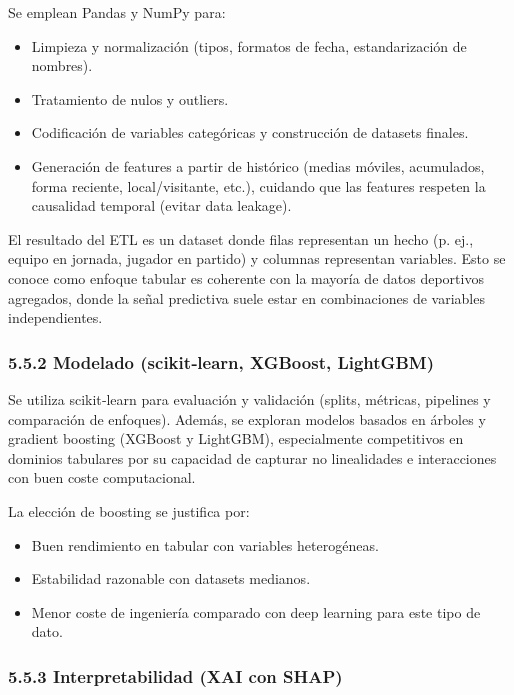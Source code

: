 Se emplean Pandas y NumPy para:

\begin{itemize}
\item Limpieza y normalización (tipos, formatos de fecha, estandarización de nombres).
\item Tratamiento de nulos y outliers.
\item Codificación de variables categóricas y construcción de datasets finales.
\item Generación de features a partir de histórico (medias móviles, acumulados, forma reciente, 
local/visitante, etc.), cuidando que las features respeten la causalidad temporal (evitar 
data leakage).
\end{itemize}

El resultado del ETL es un dataset donde filas representan un hecho (p. ej., equipo en jornada, 
jugador en partido) y columnas representan variables. Esto se conoce como enfoque tabular es coherente con la 
mayoría de datos deportivos agregados, donde la señal predictiva suele estar en combinaciones de 
variables independientes.

\subsubsection{5.5.2 Modelado (scikit‑learn, XGBoost, LightGBM)}

Se utiliza scikit‑learn para evaluación y validación (splits, métricas, pipelines y comparación de 
enfoques). Además, se exploran modelos basados en árboles y gradient boosting (XGBoost y LightGBM), 
especialmente competitivos en dominios tabulares por su capacidad de capturar no linealidades e 
interacciones con buen coste computacional.

La elección de boosting se justifica por:

\begin{itemize}
\item Buen rendimiento en tabular con variables heterogéneas.
\item Estabilidad razonable con datasets medianos.
\item Menor coste de ingeniería comparado con deep learning para este tipo de dato.
\end{itemize}

\subsubsection{5.5.3 Interpretabilidad (XAI con SHAP)}

